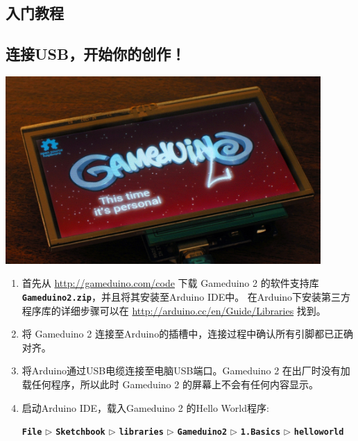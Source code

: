 \documentclass[10pt]{book}
\newcommand{\gdtwo}{Gameduino 2 }
\newcommand{\mach}[1]{\texttt{\textbf{#1}}}
\begin{document}
\begin{CJK}{UTF8}{gkai}
\vfill


\endgroup

\thispagestyle{empty}
\pagestyle{headings}

\renewcommand{\contentsname}{目录}
\tableofcontents

\part{入门教程}

\chapter{连接USB，开始你的创作！}

\begin{center}
\includegraphics[width=0.9\textwidth]{assets/plugin.jpg}
\end{center}

\begin{enumerate}

\item
首先从 \url{http://gameduino.com/code} 下载 \gdtwo 的软件支持库 \mach{Gameduino2.zip}，并且将其安装至Arduino IDE中。
在Arduino下安装第三方程序库的详细步骤可以在 \url{http://arduino.cc/en/Guide/Libraries} 找到。

\item
将 \gdtwo 连接至Arduino的插槽中，连接过程中确认所有引脚都已正确对齐。

\item
将Arduino通过USB电缆连接至电脑USB端口。\gdtwo 在出厂时没有加载任何程序，所以此时 \gdtwo 的屏幕上不会有任何内容显示。

\item
启动Arduino IDE，载入\gdtwo 的Hello World程序:\\
\begin{small}
\mach{File} $\triangleright$
\mach{Sketchbook} $\triangleright$
\mach{libraries} $\triangleright$
\mach{Gameduino2} $\triangleright$
\mach{1.Basics} $\triangleright$
\mach{helloworld}
\end{small}


\end{enumerate}
\end{CJK}
\end{document}
